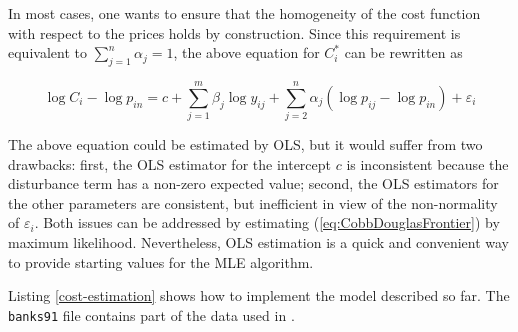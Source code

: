 In most cases, one wants to ensure that the homogeneity of the cost
function with respect to the prices holds by construction. Since this
requirement is equivalent to $\sum_{j=1}^n \alpha_j = 1$, the above
equation for $C^*_i$ can be rewritten as

\begin{equation}
  \label{eq:CobbDouglasFrontier}
  \log C_i - \log p_{in}  = c + \sum_{j=1}^m \beta_j \log y_{ij} +
  \sum_{j=2}^n \alpha_j (\log p_{ij} - \log p_{in})  + \varepsilon_i
\end{equation}

The above equation could be estimated by OLS, but it would suffer from
two drawbacks: first, the OLS estimator for the intercept $c$ is
inconsistent because the disturbance term has a non-zero expected
value; second, the OLS estimators for the other parameters are
consistent, but inefficient in view of the non-normality of
$\varepsilon_i$. Both issues can be addressed by estimating
(\ref{eq:CobbDouglasFrontier}) by maximum likelihood. Nevertheless,
OLS estimation is a quick and convenient way to provide starting
values for the MLE algorithm.

Listing \ref{cost-estimation} shows how to implement the model
described so far. The \texttt{banks91} file contains part of the data
used in \citet*{lucchetti01}.

\begin{script}[htbp]
  \label{cost-estimation}
\end{script}

